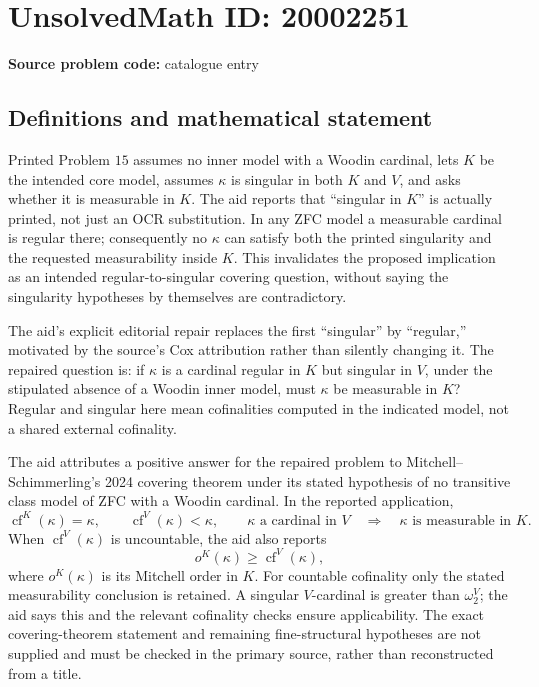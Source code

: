 \documentclass[11pt]{article}
\begin{document}
\section*{UnsolvedMath ID: 20002251}
\textbf{Source problem code:} catalogue entry
\subsection{Definitions and mathematical statement}
Printed Problem \(15\) assumes no inner model with a Woodin cardinal, lets \(K\) be the intended core model, assumes \(\kappa\) is singular in both \(K\) and \(V\), and asks whether it is measurable in \(K\). The aid reports that ``singular in \(K\)'' is actually printed, not just an OCR substitution. In any ZFC model a measurable cardinal is regular there; consequently no \(\kappa\) can satisfy both the printed singularity and the requested measurability inside \(K\). This invalidates the proposed implication as an intended regular-to-singular covering question, without saying the singularity hypotheses by themselves are contradictory.

The aid's explicit editorial repair replaces the first ``singular'' by ``regular,'' motivated by the source's Cox attribution rather than silently changing it. The repaired question is: if \(\kappa\) is a cardinal regular in \(K\) but singular in \(V\), under the stipulated absence of a Woodin inner model, must \(\kappa\) be measurable in \(K\)? Regular and singular here mean cofinalities computed in the indicated model, not a shared external cofinality.

The aid attributes a positive answer for the repaired problem to Mitchell--Schimmerling's 2024 covering theorem under its stated hypothesis of no transitive class model of ZFC with a Woodin cardinal. In the reported application,
\[
 \operatorname{cf}^K(\kappa)=\kappa,\qquad
 \operatorname{cf}^V(\kappa)<\kappa,\qquad
 \kappa\text{ a cardinal in }V
 \quad\Longrightarrow\quad
 \kappa\text{ is measurable in }K.
\]
When \(\operatorname{cf}^V(\kappa)\) is uncountable, the aid also reports
\[
 o^K(\kappa)\geq\operatorname{cf}^V(\kappa),
\]
where \(o^K(\kappa)\) is its Mitchell order in \(K\). For countable cofinality only the stated measurability conclusion is retained. A singular \(V\)-cardinal is greater than \(\omega_2^V\); the aid says this and the relevant cofinality checks ensure applicability. The exact covering-theorem statement and remaining fine-structural hypotheses are not supplied and must be checked in the primary source, rather than reconstructed from a title.
\end{document}
